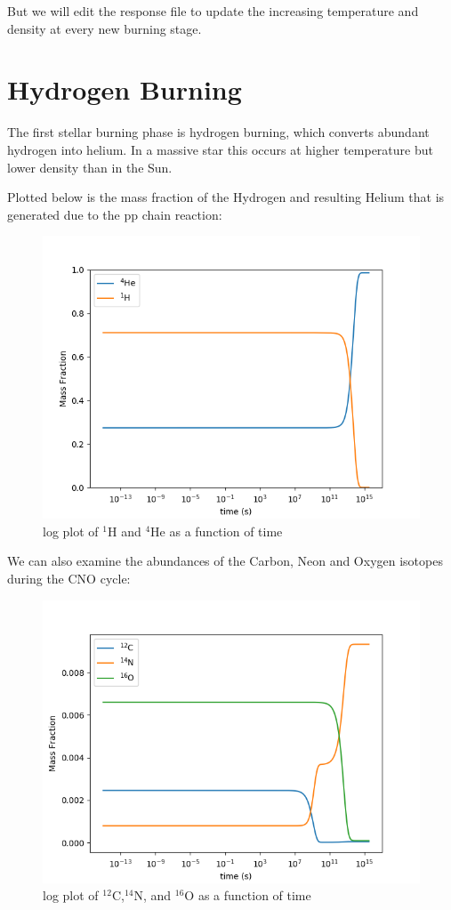 \documentclass[manuscript]{aastex62}
\begin{document}
But we will edit the response file to update the increasing temperature and density at every new burning stage.

\section{Hydrogen Burning} \label{sec:H}

The first stellar burning phase is hydrogen burning, which converts
abundant hydrogen into helium.  In a massive star
this occurs at higher temperature but lower density than in the Sun.


Plotted below is the mass fraction of the Hydrogen and resulting Helium that is generated due to the pp chain reaction:


\begin{figure}[H]
\centering
\includegraphics[scale=0.7]{task1}
\caption{log plot of $^1$H and $^4$He as a function of time}
\end{figure}


We can also examine the abundances of the Carbon, Neon and Oxygen isotopes during the CNO cycle:

\begin{figure}[H]
\centering
\includegraphics[scale=0.7]{task1_1}
\caption{log plot of $^{12}$C,$^{14}$N, and $^{16}$O as a function of time}
\end{figure}
\end{document}
